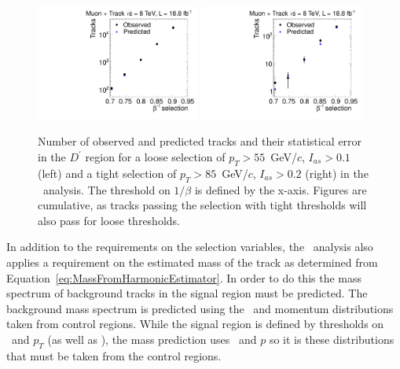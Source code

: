 \begin{figure}
\begin{center}
\includegraphics[clip=false, trim=0.0cm 0cm 0.0cm 0cm, width=0.48\textwidth]{figures/tkmu/Pred_Flip_I010_Pt55_Data8TeV}
\includegraphics[clip=false, trim=0.0cm 0cm 0.0cm 0cm, width=0.48\textwidth]{figures/tkmu/Pred_Flip_I020_Pt85_Data8TeV}
\caption[Number of observed and predicted tracks in the \invbeta\ $<$ 1 region in the \tktof\ analysis.]
{Number of observed and predicted tracks and their statistical error in the $D^\prime$ region for a loose selection of $p_T>55$~GeV/$c$, $I_{as}>0.1$ (left)
and a tight selection of $p_T>85$~GeV/$c$, $I_{as}>0.2$ (right) in the \tktof\ analysis. The threshold on $1/\beta$ is defined by the x-axis.
Figures are cumulative, as tracks passing the selection with tight thresholds will also pass for loose thresholds.}
\label{fig:PredFlipTkTOF}
\end{center}
\end{figure}

In addition to the requirements on the selection variables, the \tktof\ analysis also applies a requirement on the estimated mass of the track as determined from 
Equation~\ref{eq:MassFromHarmonicEstimator}. In order to do this the mass spectrum of background tracks in the signal region must be predicted.
The background mass spectrum is predicted using the \dedx\ and momentum distributions taken from control regions. While the signal region is defined by thresholds on \ias\ and
$p_T$ (as well as \invbeta), the mass prediction uses \ih\ and $p$ so it is these distributions that must be taken from the control regions. 


